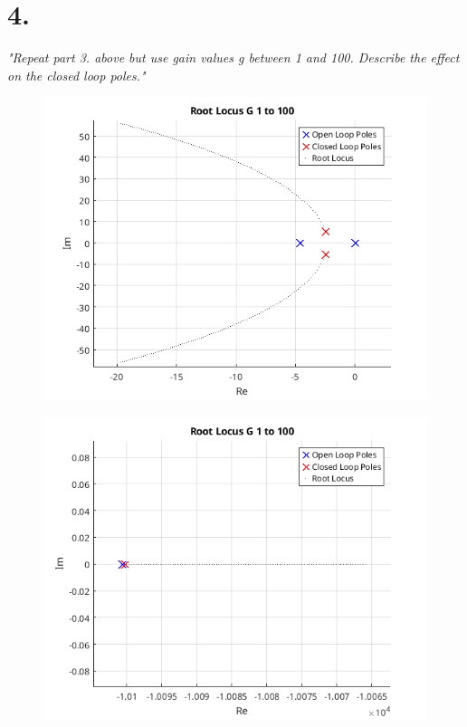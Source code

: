 \documentclass{article}
\begin{document}
\section*{4.}

\textit{
    "Repeat part 3. above but use gain values g between 1 and 100. Describe the effect on the
    closed loop poles."
}

\begin{figure}[H]
    \centering
    \includegraphics[width=\textwidth]{rootLocus100.png}
\end{figure}
\begin{figure}[H]
    \centering
    \includegraphics[width=\textwidth]{rootLocus100bigNeg.png}
\end{figure}
\end{document}
